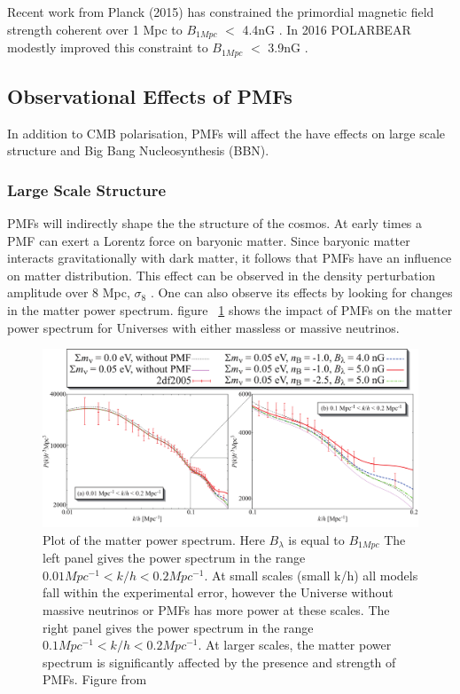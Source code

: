 Recent work from Planck (2015) has constrained the primordial magnetic field strength coherent over 1 Mpc to $B_{1Mpc}$ $<$ 4.4nG \cite{Ade:2015cva}. In 2016 POLARBEAR modestly improved this constraint to $B_{1Mpc}$ $<$ 3.9nG \cite{Ade:2015cao}.
\subsection{Observational Effects of PMFs}

In addition to CMB polarisation, PMFs will affect the have effects on large scale structure and Big Bang Nucleosynthesis (BBN).

\subsubsection{Large Scale Structure}

PMFs will indirectly shape the the structure of the cosmos. At early times a PMF can exert a Lorentz force on baryonic matter. Since baryonic matter interacts gravitationally with dark matter, it follows that PMFs have an influence on matter distribution. This effect can be observed in the density perturbation amplitude over 8 Mpc, $\sigma_8$ \cite{Yamazaki:2012pg}. One can also observe its effects by looking for changes in the matter power spectrum. figure ~\ref{fig:matterpower} shows the impact of PMFs on the matter power spectrum for Universes with either massless or massive neutrinos.

\begin{figure}[ht]
\centering
\includegraphics[scale=1.1]{images/matterpower.png} 
\caption{Plot of the matter power spectrum. Here $B_{\lambda}$ is equal to $B_{1Mpc}$ The left panel gives the power spectrum in the range $0.01 Mpc^{-1} < k/h < 0.2 Mpc^{-1}$. At small scales (small k/h) all models fall within the experimental error, however the Universe without massive neutrinos or PMFs has more power at these scales. The right panel gives the power spectrum in the range $0.1 Mpc^{-1} < k/h < 0.2 Mpc^{-1}$. At larger scales, the matter power spectrum is significantly affected by the presence and strength of PMFs. Figure from \cite{Yamazaki:2012pg}}
\label{fig:matterpower}
\end{figure}

